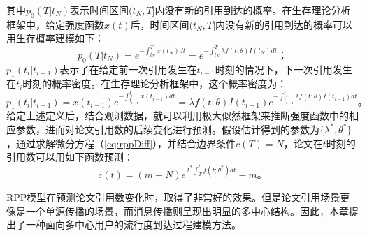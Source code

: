 其中$p_0(T|t_N)$表示时间区间$(t_N, T]$内没有新的引用到达的概率。在生存理论分析框架中，给定强度函数$x(t)$后，时间区间$(t_N, T]$内没有新的引用到达的概率可以用生存概率建模如下：
\begin{equation}
p_0(T|t_N)=e^{-\int_{t_N}^{T}x(t_N)dt}=e^{-\int_{t_N}^{T}\lambda f(t;\theta) I(t_N)dt}\text{；}
\end{equation}
$p_1(t_i|t_{i-1})$表示了在给定前一次引用发生在$t_{i-1}$时刻的情况下，下一次引用发生在$t_i$时刻的概率密度。在生存理论分析框架中，这个概率密度为：
\begin{equation}
p_1(t_i|t_{i-1})=x(t_{i-1})e^{-\int_{t_{i-1}}^{t_i}x(t_{i-1})dt}=\lambda f(t;\theta) I(t_{i-1})e^{-\int_{t_{i-1}}^{t_i}\lambda f(t;\theta) I(t_{i-1})dt}\text{。}
\end{equation}
给定上述定义后，结合观测数据，就可以利用极大似然框架来推断强度函数中的相应参数，进而对论文引用数的后续变化进行预测。假设估计得到的参数为$\{\lambda^{\ast},\theta^{\ast}\}$，通过求解微分方程（\ref{eq:rppDiff}），并结合边界条件$c(T)=N$，论文在$t$时刻的引用数可以用如下函数预测：
\begin{equation}
c(t)=(m+N)e^{\lambda^{\ast}\int_{T}^{t}f(t;\theta^{\ast})dt}-m\text{。}
\end{equation}

RPP模型在预测论文引用数变化时，取得了非常好的效果。但是论文引用场景更像是一个单源传播的场景，而消息传播则呈现出明显的多中心结构。因此，本章提出了一种面向多中心用户的流行度到达过程建模方法。
